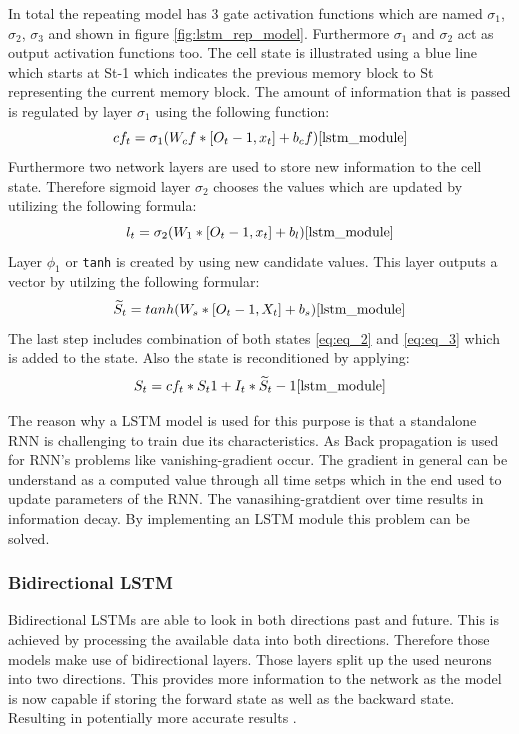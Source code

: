 In total the repeating model has 3 gate activation functions which are named $\sigma_1$, $\sigma_2$,  $\sigma_3$ and shown in figure \ref{fig:lstm_rep_model}. Furthermore $\sigma_1$ and $\sigma_2$ act as output activation functions too. The cell state is illustrated using a blue line which starts at St-1 which indicates the previous memory block to St representing the current memory block. The amount of information that is passed is regulated by layer  $\sigma_1$ using the following function:
\begin{equation}
cf_t = \sigma_1 (W_cf * [O_t-1, x_t] + b_cf)
\cite{lstm_module}
\label{eq:eq_1}
\end{equation}
Furthermore two network layers are used to store new information to the cell state. Therefore sigmoid layer $\sigma_2$ chooses the values which are updated by utilizing the following formula:
\begin{equation}
l_t = \sigma_2(W_1 *[O_t-1, x_t]+ b_l)
\cite{lstm_module}
\label{eq:eq_2}
\end{equation}
Layer $\phi_1$ or \verb|tanh| is created by using new candidate values. This layer outputs a  vector by utilzing the following formular: 
\begin{equation}
\widetilde{S}_t = tanh(W_s * [O_t-1, X_t] + b_s)
\cite{lstm_module}
\label{eq:eq_3}
\end{equation}
The last step includes combination of both states \ref{eq:eq_2} and \ref{eq:eq_3} which is added to the state. Also the state is reconditioned by applying: \cite{lstm_module}
\begin{equation}
S_t = cf_t * S_t1 + I_t * \widetilde{S}_t-1
\cite{lstm_module}
\label{eq:eq_4}
\end{equation}

The reason why a LSTM model is used for this purpose is that a standalone RNN is challenging to train due its characteristics. As Back propagation is used for RNN's problems like vanishing-gradient occur. The gradient in general can be understand as a computed value through all time setps which in the end used to update parameters of the RNN. The vanasihing-gratdient over time results in information decay. By implementing an LSTM module this problem can be solved. \cite{lstm_overcome_rnn_problem}

\subsubsection{Bidirectional LSTM}
Bidirectional LSTMs are able to look in both directions past and future. This is achieved by processing the available data into both directions. Therefore those models make use of bidirectional layers. Those layers split up the used neurons into two directions. \cite{bi_di_1} This provides more information to the network as the model is now capable if storing the forward state as well as the backward state. Resulting in potentially more accurate results \cite{bi_di_2}. 

